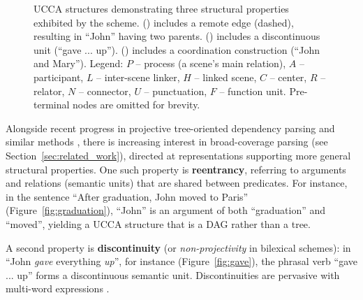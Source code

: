 \documentclass[11pt]{article}
\newcommand{\secref}[1]{Section~\ref{#1}}
\newcommand{\figref}[1]{Figure~\ref{#1}}
\begin{document}
\begin{figure}[t]
\begin{subfigure}[t]{.9\columnwidth}
  \hspace{.1\columnwidth}
  \parbox{.7\columnwidth}{
  }
  \end{subfigure}
  \caption{\label{fig:examples}
    UCCA structures demonstrating three structural properties exhibited by
    the scheme.
    () includes a remote edge (dashed),
    resulting in ``John'' having two parents.
    () includes a discontinuous unit (``gave ... up'').
    () includes a coordination construction (``John and Mary'').
    Legend: $P$ -- process (a scene's main relation), $A$ -- participant,
    $L$ -- inter-scene linker, $H$ -- linked scene, $C$ -- center,
    $R$ -- relator, $N$ -- connector, $U$ -- punctuation, $F$ -- function unit.
    Pre-terminal nodes are omitted for brevity.
  }
\end{figure}

Alongside recent progress in projective tree-oriented dependency parsing and similar methods
\cite{dyer2015transition,andor2016globally,kiperwasser2016simple},
there is increasing interest in broad-coverage parsing (see \secref{sec:related_work}),
directed at representations supporting more general structural properties.
One such property is \textbf{reentrancy},
referring to arguments and relations (semantic units) that are shared between predicates.
For instance, in the sentence
``After graduation, John moved to Paris'' (\figref{fig:graduation}),
``John'' is an argument of both ``graduation''
and ``moved'', yielding a UCCA structure that is a DAG rather than a tree.

A second property is \textbf{discontinuity} (or \textit{non-projectivity} in bilexical schemes):
in ``John \textit{gave} everything \textit{up}'', for instance
(\figref{fig:gave}), the phrasal verb ``gave ... up'' forms a discontinuous semantic unit.
Discontinuities are pervasive with multi-word
expressions \cite{schneider2014discriminative}.
\end{document}
